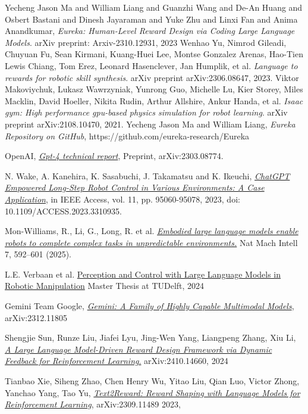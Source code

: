 \documentclass[10pt,twocolumn]{article}
\begin{document}
\begin{thebibliography}{9}
Yecheng Jason Ma and William Liang and Guanzhi Wang and De-An Huang and Osbert Bastani and Dinesh Jayaraman and Yuke Zhu and Linxi Fan and Anima Anandkumar, \emph{Eureka: Human-Level Reward Design via Coding Large Language Models}. arXiv preprint: Arxiv-2310.12931, 2023
Wenhao Yu, Nimrod Gileadi, Chuyuan Fu, Sean Kirmani, Kuang-Huei Lee, Montse Gonzalez Arenas, Hao-Tien Lewis Chiang, Tom Erez, Leonard Hasenclever, Jan Humplik, et al. \emph{Language to rewards for robotic skill synthesis}. arXiv preprint arXiv:2306.08647, 2023.
Viktor Makoviychuk, Lukasz Wawrzyniak, Yunrong Guo, Michelle Lu, Kier Storey, Miles Macklin,
David Hoeller, Nikita Rudin, Arthur Allshire, Ankur Handa, et al. \emph{Isaac gym: High performance
gpu-based physics simulation for robot learning}. arXiv preprint arXiv:2108.10470, 2021.
Yecheng Jason Ma and William Liang, \emph{Eureka Repository on GitHub}, https://github.com/eureka-research/Eureka

OpenAI,
\href{https://arxiv.org/abs/2303.08774}{\emph{Gpt-4 technical report}},
Preprint,
arXiv:2303.08774.

N. Wake, A. Kanehira, K. Sasabuchi, J. Takamatsu and K. Ikeuchi, 
\href{https://ieeexplore.ieee.org/document/10235949}{\emph{ChatGPT Empowered Long-Step Robot Control in Various Environments: A Case Application}},
in IEEE Access, vol. 11, pp. 95060-95078, 2023, 
doi: 10.1109/ACCESS.2023.3310935.

Mon-Williams, R., Li, G., Long, R. et al. 
\href{https://doi.org/10.1038/s42256-025-01005-x}{\emph{Embodied large language models enable robots to complete complex tasks in unpredictable environments.}}
Nat Mach Intell 7, 592–601 (2025). 

L.E. Verbaan et al.
\href{https://repository.tudelft.nl/record/uuid:2944a8e1-0a54-492b-af63-193a7ac11db8#title}{Perception and Control with Large Language Models in Robotic Manipulation}
Master Thesis at TUDelft, 2024

Gemini Team Google,
\href{https://arxiv.org/abs/2312.11805}{\emph{Gemini: A Family of Highly Capable Multimodal Models}},
arXiv:2312.11805

Shengjie Sun, Runze Liu, Jiafei Lyu, Jing-Wen Yang, Liangpeng Zhang, Xiu Li,
\href{https://doi.org/10.48550/arXiv.2410.14660}{\emph{A Large Language Model-Driven Reward Design Framework via Dynamic Feedback for Reinforcement Learning}.}
arXiv:2410.14660, 2024

Tianbao Xie, Siheng Zhao, Chen Henry Wu, Yitao Liu, Qian Luo, Victor Zhong, Yanchao Yang, Tao Yu,
\href{https://doi.org/10.48550/arXiv.2309.11489}{\emph{Text2Reward: Reward Shaping with Language Models for Reinforcement Learning}},
arXiv:2309.11489 2023,

\end{thebibliography}
\end{document}
